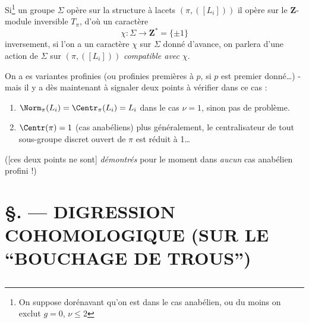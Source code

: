 Si\footnote{On suppose dorénavant qu'on est dans le cas anabélien, ou du moins on exclut $g = 0$, $\nu \leq 2$} un groupe $\Sigma$ opère sur la structure à lacets $(\pi, ([L_i]))$ il opère sur le $\mathbf{Z}$-module inversible $T_\pi$, d'où un caractère
$$
\chi: \Sigma \to \mathbf{Z}^* = \{ \pm 1 \}
$$
inversement, si l'on a un caractère $\chi$ sur $\Sigma$ donné d'avance, on parlera d'une action de $\Sigma$ sur $(\pi, ([L_i]))$ \emph{compatible avec $\chi$}.

On a es variantes profinies (ou profinies premières à $p$, si $p$ est premier donné\dots) - mais il y a dès maintenant à signaler deux points à vérifier dans ce cas :
\begin{enumerate}
    \item[] $\Norm_\pi (L_i) = \Centr_\pi (L_i) = L_i$ dans le cas $\nu = 1$, sinon pas de problème.
    \item[] $\Centr(\pi) = 1$ (cas anabéliens) plus généralement, le centralisateur de tout sous-groupe discret ouvert de $\pi$ est réduit à 1\dots
\end{enumerate}
([ces deux points ne sont] \emph{démontrés} pour le moment dans \emph{aucun} cas anabélien profini !)
















\chapter*{\S {}. --- DIGRESSION COHOMOLOGIQUE (SUR LE ``BOUCHAGE DE TROUS'')}\thispagestyle{empty}
\label{sec:14}
\section*{}

